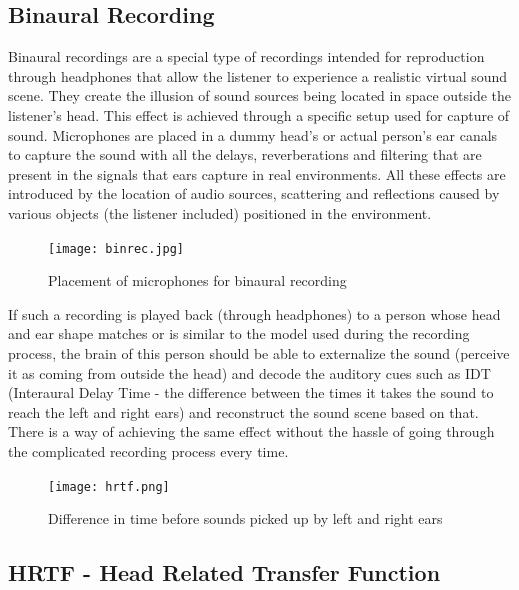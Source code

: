 \documentclass[a4paper,12pt,oneside]{article}
\begin{document}
\subsection{Binaural Recording}
  
Binaural recordings are a special type of recordings intended for reproduction through headphones that allow the listener to experience a realistic virtual sound scene. They create the illusion of sound sources being located in space outside the listener's head. This effect is achieved through a specific setup used for capture of sound. Microphones are placed in a dummy head's or actual person's ear canals to capture the sound with all the delays, reverberations and filtering that are present in the signals that ears capture in real environments. All these effects are introduced by the location of audio sources, scattering and reflections caused by various objects (the listener included) positioned in the environment.\cite{hrtf1}\\

\begin{center}
\begin{figure}[H]
    \centering
    \texttt{[image: binrec.jpg]}
    \caption{Placement of microphones for binaural recording}
    \label{fig:binaural recording}
\end{figure}
\end{center}

If such a recording is played back (through headphones) to a person whose head and ear shape matches or is similar to the model used during the recording process, the brain of this person should be able to externalize the sound (perceive it as coming from outside the head) and decode the auditory cues such as IDT (Interaural Delay Time - the difference between the times it takes the sound to reach the left and right ears) and reconstruct the sound scene based on that. There is a way of achieving the same effect without the hassle of going through the complicated recording process every time.\\

\begin{center}
\begin{figure}[H]
    \centering
    \texttt{[image: hrtf.png]}
    \caption{Difference in time before sounds picked up by left and right ears}
    \label{fig:interaural delay time}
\end{figure}
\end{center}

\subsection{HRTF - Head Related Transfer Function}
  
\end{document}
